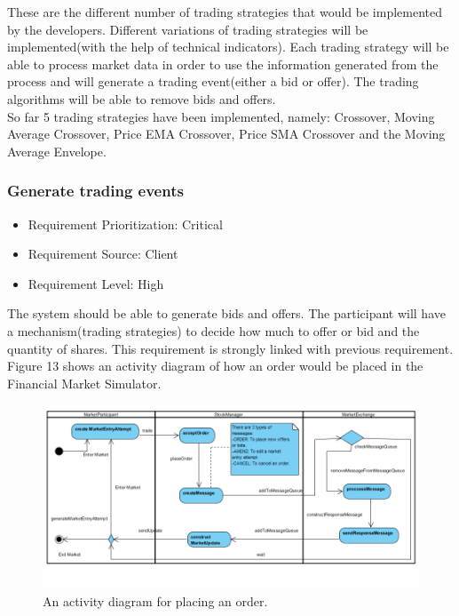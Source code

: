 \documentclass[12pt]{article}
\begin{document}
				These are the different number of trading strategies that would be implemented by the developers. Different variations of trading strategies will be implemented(with the help of technical indicators). Each trading strategy will be able to process market data in order to use the information generated from the process and will generate a trading event(either a bid or offer). The trading algorithms will be able to remove bids and offers.\\
				
				So far 5 trading strategies have been implemented, namely: Crossover, Moving Average Crossover, Price EMA Crossover, Price SMA Crossover and the Moving Average Envelope. 
				\subsubsection{Generate trading events }
				\begin{itemize}
					\item Requirement Prioritization: Critical
					\item Requirement Source: Client 	
					\item Requirement Level: High
				\end{itemize}  
				
				The system should be able to generate bids and offers. The participant will have a mechanism(trading strategies) to decide how much to offer or bid and the quantity of shares. This requirement is strongly linked with previous requirement.\\
				
				Figure 13 shows an activity diagram of how an order would be placed in the Financial Market Simulator.	 
				
\begin{figure}[th!]
\centering
\includegraphics[scale=0.7]{./placeOrder_activity}
\caption{An activity diagram for placing an order.}
\label{domain objects}
\end{figure}
			\pagebreak			 
\end{document}
